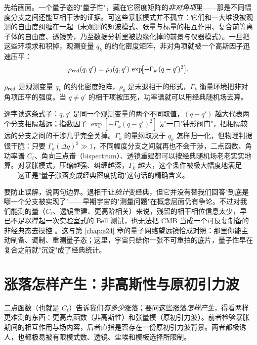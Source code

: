 先给画面。一个量子态的"量子性"，藏在它密度矩阵的\emph{非对角项}里——那是不同幅度分支之间还能互相干涉的证据。可这些暴胀模式并不孤立：它们和一大堆没被观测的自由度纠缠在一起（未观测的短波模式、张量与标量的相互作用、复合前等离子体的自由度、透镜势，乃至数据分析里被边缘化掉的前景与仪器模式）。一旦把这些环境求和积掉，观测变量 \(q_k\) 的约化密度矩阵，非对角项就被一个高斯因子迅速压平：
\begin{equation}
  \rho_{\rm red}(q,q')=\rho_0(q,q')\,\exp\!\bigl[-\Gamma_k\,(q-q')^2\bigr] .
  \label{eq:e23-decoherence-density}
\end{equation}
\begin{formulaexplain}
\(\rho_{\rm red}\) 是观测变量 \(q_k\) 的约化密度矩阵，\(\rho_0\) 是未退相干的形式，\(\Gamma_k\) 衡量环境把非对角项压平的强度。当 \(q\ne q'\) 的相干项被压死，功率谱就可以用经典随机场去算。
\end{formulaexplain}
逐字读这条式子：\(q,q'\) 是同一个观测变量的两个不同取值，\((q-q')\) 越大代表两个分支相隔越远；指数因子 \(\exp[-\Gamma_k(q-q')^2]\) 是一口"钟形阀门"，把相隔较远的分支之间的干涉几乎完全关掉。\(\Gamma_k\) 的量纲取决于 \(q_k\) 怎样归一化，但物理判据很干脆：只要 \(\Gamma_k(\Delta q)^2\gg1\)，不同幅度分支之间就再也不会干涉，二点函数、角功率谱 \(C_\ell\)、角向三点谱（bispectrum）、透镜重建都可以按经典随机场老老实实地算。对暴胀模式，压缩越强、纠缠越深，\(\Gamma_k\) 越大，这个条件被极大幅度地满足——这正是"量子涨落变成经典密度扰动"这句话的精确含义。

要防止误解，说两句边界。退相干让\emph{统计}变经典，但它并没有替我们回答"到底是哪一个分支被实现了"——早期宇宙的"测量问题"在概念层面仍有争论。不过对我们能测的量（\(C_\ell\)、透镜重建、更高阶相关）来说，残留的相干相位信息太少，早已不足以撑起一次实验室式的 Bell 测试，也无法把 CMB 当成一个可反复制备的非经典态去操控 \citep{1996CQGra..13..377P,2006CQGra..23.2317P}。这与第 \ref{chap:e24} 章的量子网络望远镜恰成对照：那里你能主动制备、调制、重测量子态；这里，宇宙只给你一张不可重拍的底片，量子性早在复合之前就"沉淀"成了经典统计。

\section{涨落怎样产生：非高斯性与原初引力波}
\label{sec:e23-tensors}

二点函数（也就是 \(C_\ell\)）告诉我们\emph{有多少}涨落；要问这些涨落\emph{怎样产生}，得看两样更难测的东西：更高点函数（非高斯性）和张量模（原初引力波）。前者检验暴胀期间的相互作用与场内容，后者直指是否存在一份原初引力波背景。两者都极诱人，也都极易被有限模式数、透镜、尘埃和模板选择所限制。

